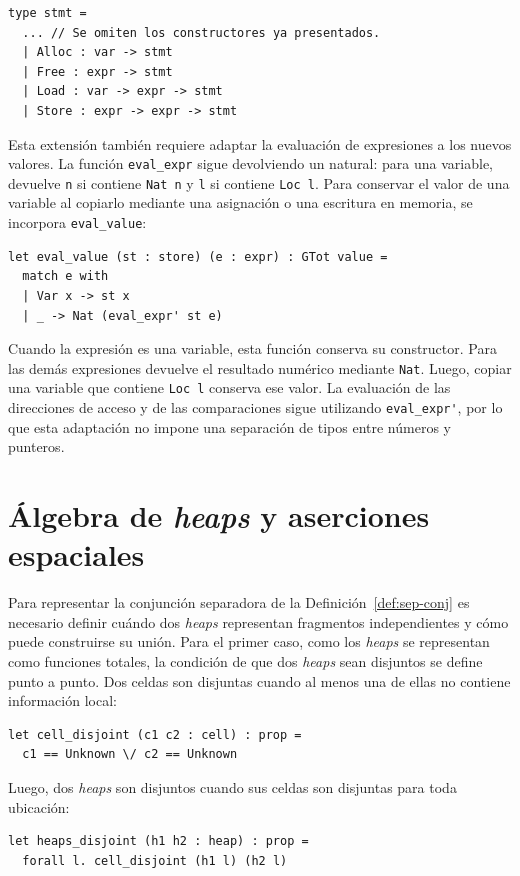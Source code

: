 \documentclass[a4paper,	11pt]{report}
\begin{document}
\begin{lstlisting}
type stmt =
  ... // Se omiten los constructores ya presentados. 
  | Alloc : var -> stmt
  | Free : expr -> stmt
  | Load : var -> expr -> stmt
  | Store : expr -> expr -> stmt
\end{lstlisting}

Esta extensión también requiere adaptar la evaluación de expresiones a los nuevos valores.
La función \lstinline|eval_expr| sigue devolviendo un natural:
para una variable,
devuelve \lstinline|n| si contiene \lstinline|Nat n| y \lstinline|l| si contiene \lstinline|Loc l|.
Para conservar el valor de una variable al copiarlo mediante una asignación o una escritura en memoria,
se incorpora \lstinline|eval_value|:

\begin{lstlisting}
let eval_value (st : store) (e : expr) : GTot value =
  match e with
  | Var x -> st x
  | _ -> Nat (eval_expr' st e)
\end{lstlisting}
Cuando la expresión es una variable,
esta función conserva su constructor.
Para las demás expresiones devuelve el resultado numérico mediante \lstinline|Nat|.
Luego,
copiar una variable que contiene \lstinline|Loc l| conserva ese valor.
La evaluación de las direcciones de acceso y de las comparaciones sigue utilizando \lstinline|eval_expr'|,
por lo que esta adaptación no impone una separación de tipos entre números y punteros.

\section{Álgebra de \emph{heaps} y aserciones espaciales}
\label{sec:isl-aserciones}
Para representar la conjunción separadora de la Definición~\ref{def:sep-conj}
es necesario definir cuándo dos \emph{heaps} representan fragmentos independientes y cómo puede construirse su unión.
Para el primer caso, como los \emph{heaps} se representan como funciones totales,
la condición de que dos \emph{heaps} sean disjuntos se define punto a punto.
Dos celdas son disjuntas cuando al menos una de ellas no contiene información local:

\begin{lstlisting}
let cell_disjoint (c1 c2 : cell) : prop =
  c1 == Unknown \/ c2 == Unknown
\end{lstlisting}

Luego,
dos \emph{heaps} son disjuntos cuando sus celdas son disjuntas para toda ubicación:

\begin{lstlisting}
let heaps_disjoint (h1 h2 : heap) : prop =
  forall l. cell_disjoint (h1 l) (h2 l)
\end{lstlisting}
\end{document}
